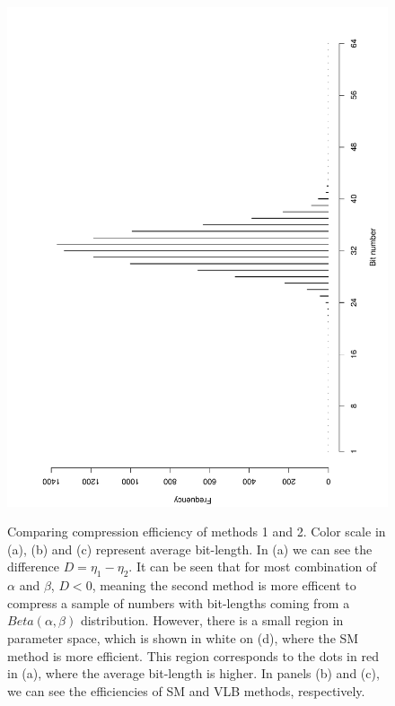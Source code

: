 \documentclass[10pt]{article}
\begin{document}
\begin{figure}[h]
{   \includegraphics[scale=0.18,clip]{fig05}
   }
  \caption{Comparing compression efficiency of methods 1 and 2. Color scale in (a), (b) and (c) represent average bit-length. In (a) we can see the difference $D = \eta_1 - \eta_2$. It can be seen that for most combination of $\alpha$ and $\beta$, $D<0$, meaning the second method is more efficent to compress a sample of numbers with bit-lengths coming from a $Beta(\alpha,\beta)$ distribution. However, there is a small region in parameter space, which is shown in white on (d), where the SM method is more efficient. This region corresponds to the dots in red in (a), where the average bit-length is higher. In panels (b) and (c), we can see the efficiencies of SM and VLB methods, respectively.}
  \label{fig:06070809}
\end{figure}
 
\end{document}
